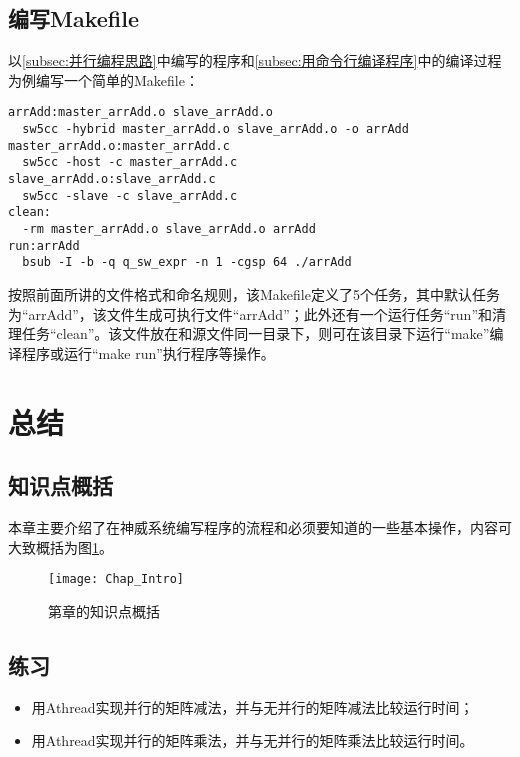 \subsection{编写Makefile}\label{subsec:编写Makefile}
以\ref{subsec:并行编程思路}中编写的程序和\ref{subsec:用命令行编译程序}中的编译过程为例编写一个简单的Makefile：
\begin{lstlisting}
arrAdd:master_arrAdd.o slave_arrAdd.o
  sw5cc -hybrid master_arrAdd.o slave_arrAdd.o -o arrAdd
master_arrAdd.o:master_arrAdd.c
  sw5cc -host -c master_arrAdd.c
slave_arrAdd.o:slave_arrAdd.c
  sw5cc -slave -c slave_arrAdd.c
clean:
  -rm master_arrAdd.o slave_arrAdd.o arrAdd
run:arrAdd
  bsub -I -b -q q_sw_expr -n 1 -cgsp 64 ./arrAdd
\end{lstlisting}

按照前面所讲的文件格式和命名规则，该Makefile定义了5个任务，其中默认任务为“arrAdd”，该文件生成可执行文件“arrAdd”；此外还有一个运行任务“run”和清理任务“clean”。该文件放在和源文件同一目录下，则可在该目录下运行“make”编译程序或运行“make run”执行程序等操作。

\section{总结}
\subsection{知识点概括}
本章主要介绍了在神威系统编写程序的流程和必须要知道的一些基本操作，内容可大致概括为图\ref{fig:Chap_Intro}。

\begin{figure}[!htbp]
	\centering
	\texttt{[image: Chap\_Intro]}
	\caption{第\thechapter{}章的知识点概括}
	\label{fig:Chap_Intro}
\end{figure}

\subsection{练习}
\begin{itemize}
	\item 用Athread实现并行的矩阵减法，并与无并行的矩阵减法比较运行时间；
	\item 用Athread实现并行的矩阵乘法，并与无并行的矩阵乘法比较运行时间。
\end{itemize}